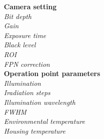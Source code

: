 \begin{minipage}[t]{0.975\linewidth}
\begin{multicols}{2}
\textbf{Camera setting} \hfill
\\[1mm]
\textsl{Bit depth} \hfill %
\\[1mm]
\textsl{Gain} \hfill %
\\[1mm]
\textsl{Exposure time} \hfill %
\\[1mm]
\textsl{Black level} \hfill %
\\[1mm]
\textsl{ROI} \hfill %
\\[1mm]
\textsl{FPN correction} \hfill %
\\[1mm]
\textbf{Operation point parameters}
\\[1mm]
\textsl{Illumination} \hfill %
\\[1mm]
\textsl{Iradiation steps} \hfill %
\\[1mm]
\textsl{Illumination wavelength} \hfill %
\\[1mm]
\textsl{FWHM} \hfill %
\\[1mm]
\textsl{Environmental temperature} \hfill %
\\[1mm]
\textsl{Housing temperature} \hfill %
\\[1mm]
\end{multicols}
\end{minipage}
